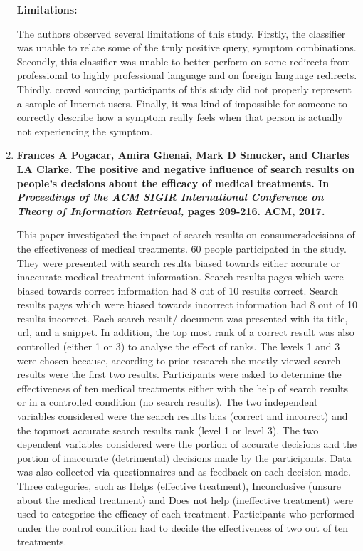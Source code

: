 \documentclass[]{article}
\begin{document}
\begin{enumerate}
\textbf{Limitations:} 

The authors observed several limitations of this study. Firstly, the classifier was unable to relate some of the truly positive query, symptom combinations. Secondly, this classifier was unable to better perform on some redirects from professional to highly professional language and on foreign language redirects. Thirdly, crowd sourcing participants of this study did not properly represent a sample of Internet users. Finally, it was kind of impossible for someone to correctly describe how a symptom really feels when that person is actually not experiencing the symptom. \\ 

\item {\textbf{Frances A Pogacar, Amira Ghenai, Mark D Smucker, and Charles LA Clarke. The positive and negative influence of search results on people’s decisions about the efficacy of medical treatments. In \textit{Proceedings of the ACM SIGIR International Conference on Theory of Information Retrieval,} pages 209-216. ACM, 2017.}}

This paper investigated the impact of search results on consumers\textquotesingle decisions of the effectiveness of medical treatments. 60 people participated in the study. They were presented with search results biased towards either accurate or inaccurate medical treatment information. Search results pages which were biased towards correct information had 8 out of 10 results correct. Search results pages which were biased towards incorrect information had 8 out of 10 results incorrect. Each search result/ document was presented with its title, url, and a snippet. In addition, the top most rank of a correct result was also controlled (either 1 or 3) to analyse the effect of ranks. The levels 1 and 3 were chosen because, according to prior research the mostly viewed search results were the first two results. Participants were asked to determine the effectiveness of ten medical treatments either with the help of search results or in a controlled condition (no search results). The two independent variables considered were the search results bias (correct and incorrect) and the topmost accurate search result\textquotesingle s rank (level 1 or level 3). The two dependent variables considered were the portion of accurate decisions and the portion of inaccurate (detrimental) decisions made by the participants. Data was also collected via questionnaires and as feedback on each decision made. Three categories, such as Helps (effective treatment), Inconclusive (unsure about the medical treatment) and Does not help (ineffective treatment) were used to categorise the efficacy of each treatment. Participants who performed under the control condition had to decide the effectiveness of two out of ten treatments. 


\end{enumerate}
\end{document}
